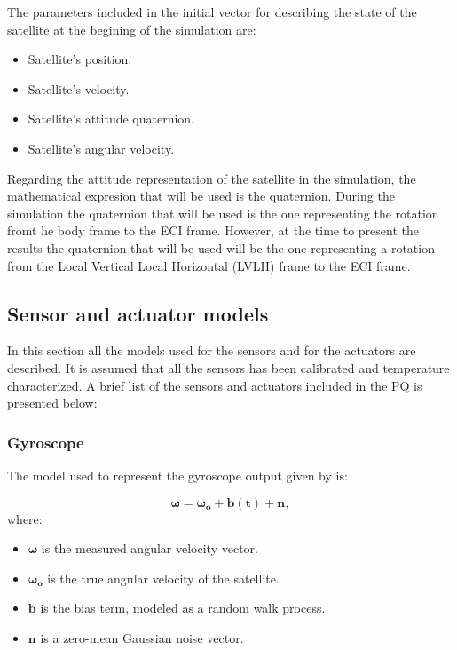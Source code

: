 \noindent The parameters included in the initial vector for describing the state of the satellite at the begining of the simulation are:

\begin{itemize}
    \item Satellite's position.
    \item Satellite's velocity.
    \item Satellite's attitude quaternion.
    \item Satellite's angular velocity.
\end{itemize}

\noindent Regarding the attitude representation of the satellite in the simulation, the mathematical expresion that will be used is the quaternion. During the
simulation the quaternion that will be used is the one representing the rotation fromt he body frame to the ECI frame. However, at the time to 
present the results the quaternion that will be used will be the one representing a rotation from the Local Vertical Local Horizontal (LVLH) frame to the ECI frame.

\subsection{Sensor and actuator models}
In this section all the models used for the sensors and for the actuators are described. It is assumed that all the sensors has been calibrated
and temperature characterized. A brief list of the sensors and actuators included in the PQ is presented below:

\sensorsactuators

\subsubsection{Gyroscope}
The model used to represent the gyroscope output given by \cite{Landis} is:

\begin{equation}
    \boldsymbol{\omega} = \boldsymbol{\omega_o} +\boldsymbol{b(t)}+\boldsymbol{n},
\end{equation}
where:
\begin{itemize}
    \item $\boldsymbol{\omega}$ is the measured angular velocity vector.
    \item $\boldsymbol{\omega_o}$ is the true angular velocity of the satellite.
    \item $\boldsymbol{b}$ is the bias term, modeled as a random walk process.
    \item $\boldsymbol{n}$ is a zero-mean Gaussian noise vector.
\end{itemize}
